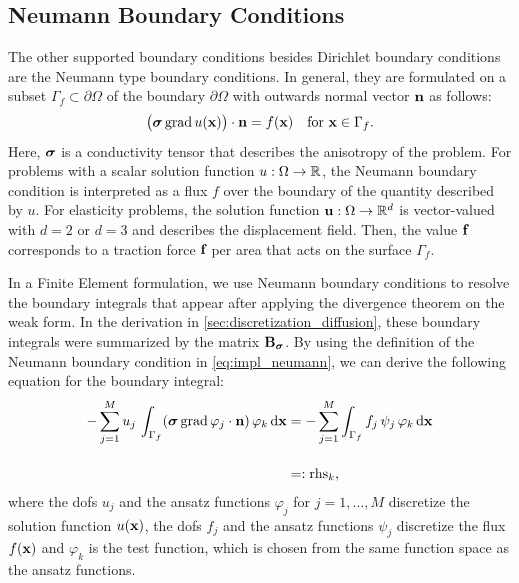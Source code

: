 

\subsection{Neumann Boundary Conditions}

The other supported boundary conditions besides Dirichlet boundary conditions are the Neumann type boundary conditions.
In general, they are formulated on a subset $\Gamma_f \subset ∂\Omega$ of the boundary $∂\Omega$ with outwards normal vector $\textbf{n}$ as follows:
%
\begin{align}\label{eq:impl_neumann}
  \big(\boldsymbol{\sigma}\,\hbox{grad} \, u(\textbf{x})\big) \cdot \textbf{n} = f(\textbf{x}) \quad \text{for }\textbf{x} \in \Gamma_f.
\end{align}
Here, $\boldsymbol{\sigma}$ is a conductivity tensor that describes the anisotropy of the problem. For problems with a scalar solution function $u: \Omega \to \mathbb{R}$, the Neumann boundary condition is interpreted as a flux $f$ over the boundary of the quantity described by $u$. For elasticity problems, the solution function $\textbf{u}: \Omega \to \mathbb{R}^d$ is vector-valued with $d=2$ or $d=3$ and describes the displacement field. Then, the value $\textbf{f}$ corresponds to a traction force $\textbf{f}$ per area that acts on the surface $\Gamma_f$.

In a Finite Element formulation, we use Neumann boundary conditions to resolve the boundary integrals that appear after applying the divergence theorem on the weak form. In the derivation in \cref{sec:discretization_diffusion}, these boundary integrals were summarized by the matrix $\textbf{B}_{\boldsymbol{\sigma}}$.
By using the definition of the Neumann boundary condition in \cref{eq:impl_neumann}, we can derive the following equation for the boundary integral:
%
\begin{subequations}
\begin{align}
  -\ds\sum\limits_{j=1}^{M} u_j\, \ds\int_{\Gamma_f} ( \bfsigma\,\grad \varphi_j \cdot \bfn)\, \varphi_k\,\d\bfx 
  &= -\ds\sum\limits_{j=1}^{M} \ds\int_{\Gamma_f} f_j\,\psi_j\,\varphi_k \,\d\bfx \label{eq:impl_neumann_a} \\[4mm] 
    &=: \text{rhs}_k, \label{eq:impl_neumann_b}
\end{align}
\end{subequations}
where the dofs $u_j$ and the ansatz functions $\varphi_j$ for $j=1,\dots,M$ discretize the solution function $u(\textbf{x})$, the dofs $f_j$ and the ansatz functions $\psi_j$ discretize the flux $f(\textbf{x})$ and $\varphi_k$ is the test function, which is chosen from the same function space as the ansatz functions.

